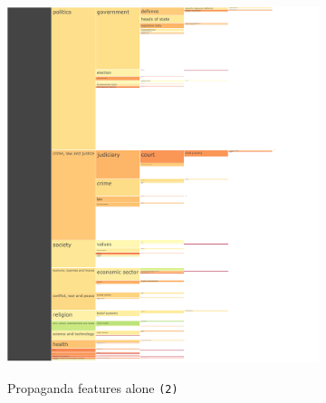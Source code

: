 \begin{figure}[!htbp]
    \centering
	\begin{subfigure}{0.49\textwidth}
            \centering
    \href{https://martinomensio.github.io/phd-project/figures/baly_iptc_weighted_f1_media_propaganda_percentages.html}{\includegraphics[trim={2.65cm 0cm 0cm 0cm},clip,width=\linewidth]{figures/baly_iptc_weighted_f1_media_propaganda_percentages.pdf}}
    \caption{Propaganda features alone \texttt{(2)}}
    \label{fig:baly_iptc_weighted_f1_media_propaganda_percentages}
\end{subfigure}
\begin{subfigure}{0.49\textwidth}
            \centering

\end{subfigure}
\end{figure}
